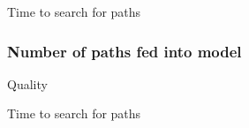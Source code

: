 Time to search for paths

\subsubsection{Number of paths fed into model}

Quality

Time to search for paths

